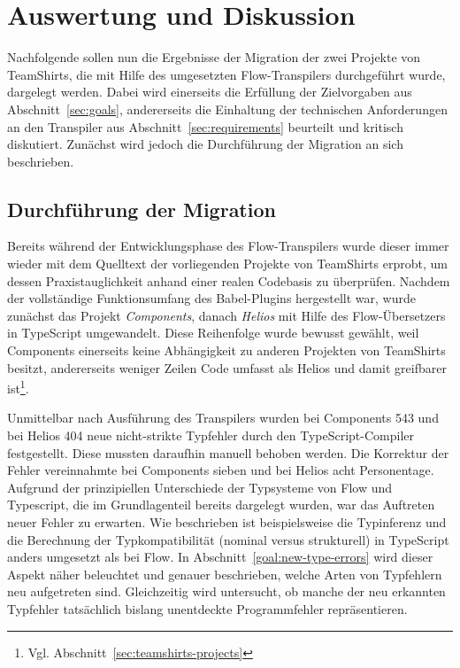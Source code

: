\chapter{Auswertung und Diskussion}
\label{chap:evaluation}

Nachfolgende sollen nun die Ergebnisse der Migration der zwei Projekte von TeamShirts, die mit Hilfe des umgesetzten Flow-Transpilers durchgeführt wurde, dargelegt werden. Dabei wird einerseits die Erfüllung der Zielvorgaben aus Abschnitt~\ref{sec:goals}, andererseits die Einhaltung der technischen Anforderungen an den Transpiler aus Abschnitt~\ref{sec:requirements} beurteilt und kritisch diskutiert. Zunächst wird jedoch die Durchführung der Migration an sich beschrieben.

\section{Durchführung der Migration}

Bereits während der Entwicklungsphase des Flow-Transpilers wurde dieser immer wieder mit dem Quelltext der vorliegenden Projekte von TeamShirts erprobt, um dessen Praxistauglichkeit anhand einer realen Codebasis zu überprüfen. Nachdem der vollständige Funktionsumfang des Babel-Plugins hergestellt war, wurde zunächst das Projekt \textit{Components}, danach \textit{Helios} mit Hilfe des Flow-Übersetzers in TypeScript umgewandelt. Diese Reihenfolge wurde bewusst gewählt, weil Components einerseits keine Abhängigkeit zu anderen Projekten von TeamShirts besitzt, andererseits weniger Zeilen Code umfasst als Helios und damit greifbarer ist\footnote{Vgl. Abschnitt~\ref{sec:teamshirts-projects}}.

Unmittelbar nach Ausführung des Transpilers wurden bei Components 543 und bei Helios 404 neue nicht-strikte Typfehler durch den TypeScript-Compiler festgestellt. Diese mussten daraufhin manuell behoben werden. Die Korrektur der Fehler vereinnahmte bei Components sieben und bei Helios acht Personentage. Aufgrund der prinzipiellen Unterschiede der Typsysteme von Flow und Typescript, die im Grundlagenteil bereits dargelegt wurden, war das Auftreten neuer Fehler zu erwarten. Wie beschrieben ist beispielsweise die Typinferenz und die Berechnung der Typkompatibilität (nominal versus strukturell) in TypeScript anders umgesetzt als bei Flow. In Abschnitt~\ref{goal:new-type-errors} wird dieser Aspekt näher beleuchtet und genauer beschrieben, welche Arten von Typfehlern neu aufgetreten sind. Gleichzeitig wird untersucht, ob manche der neu erkannten Typfehler tatsächlich bislang unentdeckte Programmfehler repräsentieren.

